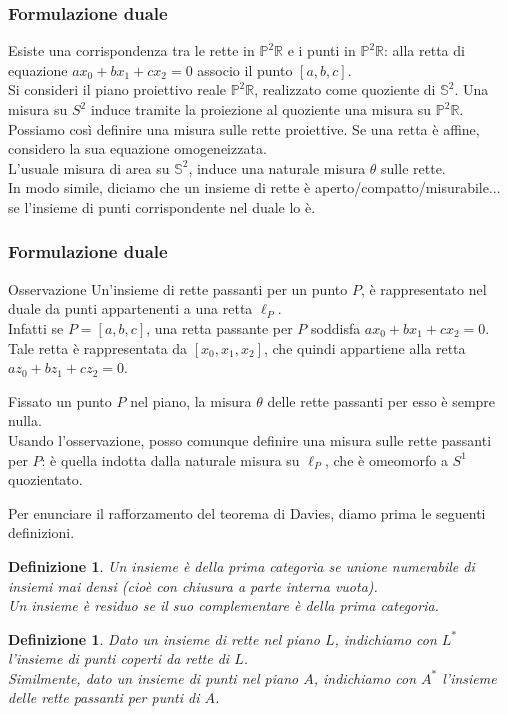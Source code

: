 \documentclass[11pt]{beamer} %
\newcommand{\R}{\mathbb{R}}
\renewcommand{\S}{\mathbb{S}}
\renewcommand{\P}{\mathbb{P}}
\newcommand{\<}{\langle}
\renewcommand{\>}{\rangle}
\theoremstyle{theorem}
\theoremstyle{theorem}
\theoremstyle{theorem}
\theoremstyle{theorem}
\newtheorem{defin}[teo]{Definizione}
\theoremstyle{theorem}
\begin{document}
\begin{frame}
	\frametitle{Formulazione duale}
	Esiste una corrispondenza tra le rette in $\P^2 \R$ e i punti in $\P^2\R$: alla retta di equazione $ax_0+bx_1+cx_2=0$ associo il punto $[a,b,c]$.\\
	\pause
	Si consideri il piano proiettivo reale $\P^2 \R$, realizzato come quoziente di $\S^2$. Una misura su $S^2$ induce tramite la proiezione al quoziente una misura su $\P^2\R$.\\
	\pause
	Possiamo così definire una misura sulle rette proiettive. Se una retta è affine, considero la sua equazione omogeneizzata.\\
	L'usuale misura di area su $\S^2$, induce una naturale misura $\theta$ sulle rette.\\
	\pause
	In modo simile, diciamo che un insieme di rette è aperto/compatto/misurabile... se l'insieme di punti corrispondente nel duale lo è.

	
\end{frame}

\begin{frame}
	\frametitle{Formulazione duale}
	
	\begin{block}{Osservazione}
		Un'insieme di rette passanti per un punto $P$, è rappresentato nel duale da punti appartenenti a una retta $\ell_P$.\\
		\pause
		Infatti se $P=[a,b,c]$, una retta passante per $P$ soddisfa $ax_0+bx_1+cx_2=0$. Tale retta è rappresentata da $[x_0,x_1,x_2]$, che quindi appartiene alla retta $az_0+bz_1+cz_2=0$.\\
	\end{block}
	
	Fissato un punto $P$ nel piano, la misura $\theta$ delle rette passanti per esso è sempre nulla.\\
	\pause
	Usando l'osservazione, posso comunque definire una misura sulle rette passanti per $P$: è quella indotta dalla naturale misura su $\ell_P$, che è omeomorfo a $S^1$ quozientato.\\
\end{frame}	

	


\begin{frame}[fragile]
	Per enunciare il rafforzamento del teorema di Davies, diamo prima le seguenti definizioni.\\
	\pause	
	\begin{defin}
	Un insieme è della prima categoria se unione numerabile di insiemi mai densi (cioè con chiusura a parte interna vuota).\\
	Un insieme è residuo se il suo complementare è della prima categoria. 
	\end{defin}
	\pause
	\begin{defin}
	Dato un insieme di rette nel piano $L$, indichiamo con $L^*$ l'insieme di punti coperti da rette di $L$.\\
	\pause
	Similmente, dato un insieme di punti nel piano $A$, indichiamo con $A^*$ l'insieme delle rette passanti per punti di $A$.
	\end{defin}

\end{frame}
\end{document}
